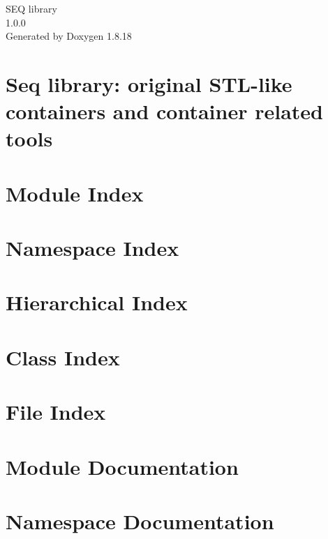 \let\mypdfximage\pdfximage\def\pdfximage{\immediate\mypdfximage}\documentclass[twoside]{book}
\newcommand{\+}{\discretionary{\mbox{\scriptsize$\hookleftarrow$}}{}{}}
\newcommand{\clearemptydoublepage}{%
  \newpage{\pagestyle{empty}\cleardoublepage}%
}
\begin{document}
\hypersetup{pageanchor=false,
             bookmarksnumbered=true,
             pdfencoding=unicode
            }
\begin{titlepage}
\vspace*{7cm}
\begin{center}%
{\Large S\+EQ library \\[1ex]\large 1.\+0.\+0 }\\
\vspace*{1cm}
{\large Generated by Doxygen 1.8.18}\\
\end{center}
\end{titlepage}
\clearemptydoublepage
{}
\tableofcontents
\clearemptydoublepage
{}
\hypersetup{pageanchor=true}

\chapter{Seq library\+: original S\+T\+L-\/like containers and container related tools}
\label{index}\hypertarget{index}{}
\chapter{Module Index}

\chapter{Namespace Index}

\chapter{Hierarchical Index}

\chapter{Class Index}

\chapter{File Index}

\chapter{Module Documentation}







\chapter{Namespace Documentation}






\end{document}

